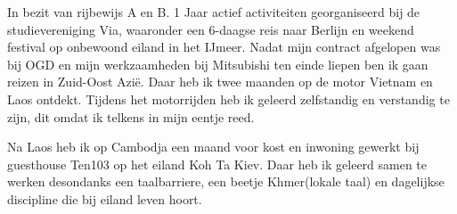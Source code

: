 In bezit van rijbewijs A en B. 
1 Jaar actief activiteiten georganiseerd bij de studievereniging Via, waaronder een 6-daagse reis naar Berlijn en weekend festival op onbewoond eiland in het IJmeer.
Nadat mijn contract afgelopen was bij OGD en mijn werkzaamheden bij Mitsubishi ten einde liepen ben ik gaan reizen in Zuid-Oost Azië. Daar heb ik twee maanden op de motor Vietnam en Laos ontdekt. Tijdens het motorrijden heb ik geleerd zelfstandig en verstandig te zijn, dit omdat ik telkens in mijn eentje reed. 


Na Laos heb ik op Cambodja een maand voor kost en inwoning gewerkt bij guesthouse Ten103 op het eiland Koh Ta Kiev. Daar heb ik geleerd samen te werken desondanks een taalbarriere, een beetje Khmer(lokale taal) en dagelijkse discipline die bij eiland leven hoort. 